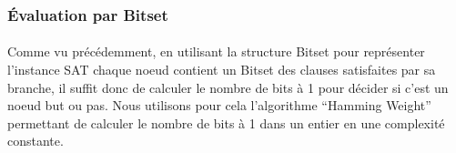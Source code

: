 \subsubsection{Évaluation par Bitset}
\paragraph{}
Comme vu précédemment, en utilisant la structure Bitset pour représenter l’instance SAT chaque noeud contient un Bitset des clauses satisfaites par sa branche, il suffit donc de calculer le nombre de bits à 1 pour décider si c’est un noeud but ou pas. Nous utilisons pour cela l’algorithme “Hamming Weight” permettant de calculer le nombre de bits à 1 dans un entier en une complexité constante.
